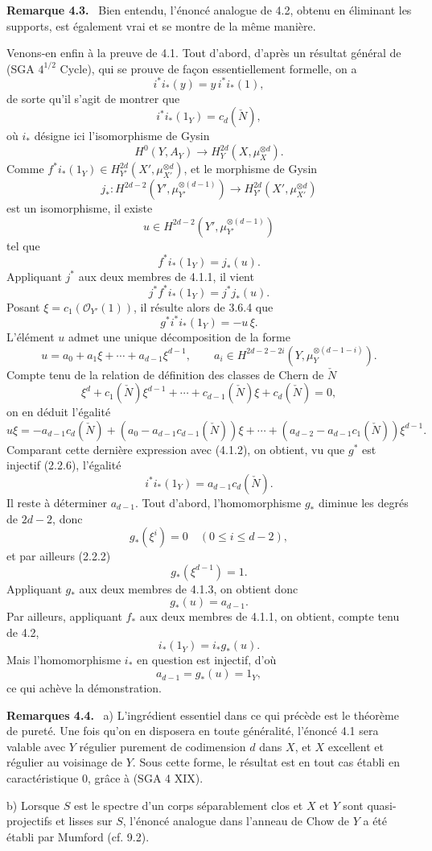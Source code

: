 \documentclass[11pt]{article}
\newenvironment{statement}[1]{\par\medskip\noindent\textbf{#1.}\ }{\par\medskip}
\begin{document}
\begin{statement}{Remarque 4.3}
Bien entendu, l'énoncé analogue de 4.2, obtenu en éliminant les supports, est également vrai et se montre de la même manière.
\end{statement}

Venons-en enfin à la preuve de 4.1. Tout d'abord, d'après un résultat général de (SGA $4^{1/2}$ Cycle), qui se prouve de façon essentiellement formelle, on a
\[
i^*i_*(y)=y\,i^*i_*(1),
\]
de sorte qu'il s'agit de montrer que
\[
i^*i_*(1_Y)=c_d(\check N),
\]
où $i_*$ désigne ici l'isomorphisme de Gysin
\[
H^0(Y,A_Y)\to H_Y^{2d}(X,\mu_X^{\otimes d}).
\]
Comme $f^*i_*(1_Y)\in H_{Y'}^{2d}(X',\mu_{X'}^{\otimes d})$, et le morphisme de Gysin
\[
j_*:H^{2d-2}(Y',\mu_{Y'}^{\otimes(d-1)})
\to H_{Y'}^{2d}(X',\mu_{X'}^{\otimes d})
\]
est un isomorphisme, il existe
\[
u\in H^{2d-2}(Y',\mu_{Y'}^{\otimes(d-1)})
\]
tel que
\[
f^*i_*(1_Y)=j_*(u).
\tag{4.1.1}
\]
Appliquant $j^*$ aux deux membres de 4.1.1, il vient
\[
j^*f^*i_*(1_Y)=j^*j_*(u).
\]
Posant $\xi=c_1(\mathcal O_{Y'}(1))$, il résulte alors de 3.6.4 que
\[
g^*i^*i_*(1_Y)=-u\,\xi.
\tag{4.1.2}
\]
L'élément $u$ admet une unique décomposition de la forme
\[
u=a_0+a_1\xi+\cdots+a_{d-1}\xi^{d-1},
\qquad
a_i\in H^{2d-2-2i}(Y,\mu_Y^{\otimes(d-1-i)}).
\tag{4.1.3}
\]
Compte tenu de la relation de définition des classes de Chern de $\check N$
\[
\xi^d+c_1(\check N)\xi^{d-1}+\cdots+c_{d-1}(\check N)\xi+c_d(\check N)=0,
\tag{4.1.4}
\]
on en déduit l'égalité
\[
u\xi=-a_{d-1}c_d(\check N)+(a_0-a_{d-1}c_{d-1}(\check N))\xi
+\cdots+(a_{d-2}-a_{d-1}c_1(\check N))\xi^{d-1}.
\]
Comparant cette dernière expression avec (4.1.2), on obtient, vu que $g^*$ est injectif (2.2.6), l'égalité
\[
i^*i_*(1_Y)=a_{d-1}c_d(\check N).
\tag{4.1.5}
\]
Il reste à déterminer $a_{d-1}$. Tout d'abord, l'homomorphisme $g_*$ diminue les degrés de $2d-2$, donc
\[
g_*(\xi^i)=0\quad(0\le i\le d-2),
\]
et par ailleurs (2.2.2)
\[
g_*(\xi^{d-1})=1.
\]
Appliquant $g_*$ aux deux membres de 4.1.3, on obtient donc
\[
g_*(u)=a_{d-1}.
\tag{4.1.6}
\]
Par ailleurs, appliquant $f_*$ aux deux membres de 4.1.1, on obtient, compte tenu de 4.2,
\[
i_*(1_Y)=i_*g_*(u).
\tag{4.1.7}
\]
Mais l'homomorphisme $i_*$ en question est injectif, d'où
\[
a_{d-1}=g_*(u)=1_Y,
\]
ce qui achève la démonstration.

\begin{statement}{Remarques 4.4}
a) L'ingrédient essentiel dans ce qui précède est le théorème de pureté. Une fois qu'on en disposera en toute généralité, l'énoncé 4.1 sera valable avec $Y$ régulier purement de codimension $d$ dans $X$, et $X$ excellent et régulier au voisinage de $Y$. Sous cette forme, le résultat est en tout cas établi en caractéristique $0$, grâce à (SGA 4 XIX).

b) Lorsque $S$ est le spectre d'un corps séparablement clos et $X$ et $Y$ sont quasi-projectifs et lisses sur $S$, l'énoncé analogue dans l'anneau de Chow de $Y$ a été établi par Mumford (cf. 9.2).
\end{statement}
\end{document}
